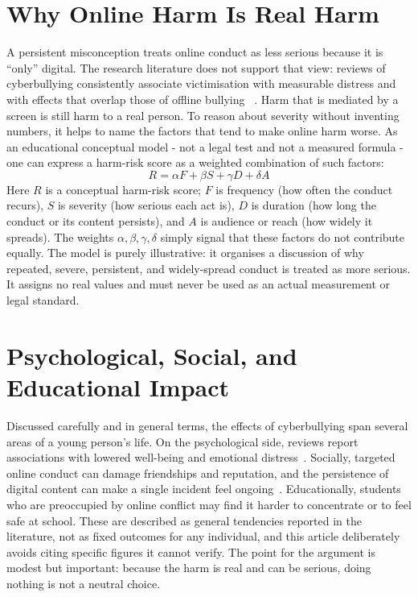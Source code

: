 \documentclass[11pt,a4paper]{report}
\begin{document}
\chapter{Why Online Harm Is Real Harm}
A persistent misconception treats online conduct as less serious because it is
``only'' digital. The research literature does not support that view: reviews
of cyberbullying consistently associate victimisation with measurable
distress and with effects that overlap those of offline bullying~%
\cite{tokunaga2010,kowalski2014}. Harm that is mediated by a screen is still
harm to a real person. To reason about severity without inventing numbers, it
helps to name the factors that tend to make online harm worse. As an
educational conceptual model - not a legal test and not a measured formula -
one can express a harm-risk score as a weighted combination of such factors:
\begin{equation}
  R = \alpha F + \beta S + \gamma D + \delta A
  \label{eq:harmrisk}
\end{equation}
Here $R$ is a conceptual harm-risk score; $F$ is frequency (how often the
conduct recurs), $S$ is severity (how serious each act is), $D$ is duration
(how long the conduct or its content persists), and $A$ is audience or reach
(how widely it spreads). The weights $\alpha, \beta, \gamma, \delta$ simply
signal that these factors do not contribute equally. The model is purely
illustrative: it organises a discussion of why repeated, severe, persistent,
and widely-spread conduct is treated as more serious. It assigns no real
values and must never be used as an actual measurement or legal standard.

\chapter{Psychological, Social, and Educational Impact}
Discussed carefully and in general terms, the effects of cyberbullying span
several areas of a young person's life. On the psychological side, reviews
report associations with lowered well-being and emotional
distress~\cite{kowalski2014}. Socially, targeted online conduct can damage
friendships and reputation, and the persistence of digital content can make a
single incident feel ongoing~\cite{smith2008}. Educationally, students who
are preoccupied by online conflict may find it harder to concentrate or to
feel safe at school. These are described as general tendencies reported in the
literature, not as fixed outcomes for any individual, and this article
deliberately avoids citing specific figures it cannot verify. The point for
the argument is modest but important: because the harm is real and can be
serious, doing nothing is not a neutral choice.
\end{document}
